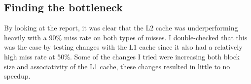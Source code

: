\documentclass[12pt]{article}
\begin{document}
\subsection*{Finding the bottleneck}
By looking at the report, it was clear that the L2 cache was underperforming heavily with a 90\% miss rate on both types of misses. I double-checked that this was the case by testing changes with the L1 cache since it also had a relatively high miss rate at 50\%. Some of the changes I tried were increasing both block size and associativity of the L1 cache, these changes resulted in little to no speedup.
\end{document}
